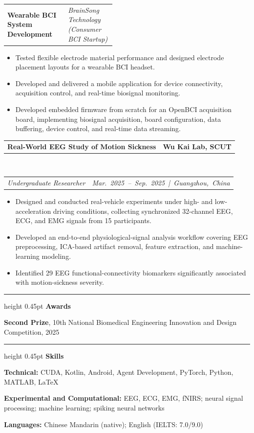 \documentclass[11pt,a4paper]{article}
\makeatletter
\newcommand{\researchentry}[5]{%
  \begin{tabularx}{\linewidth}{@{}
    >{\raggedright\arraybackslash\hyphenpenalty=10000\exhyphenpenalty=10000}X
    r@{}}
    \textbf{#1} & \textbf{#2}
  \end{tabularx}\\[1pt]
  \begin{tabularx}{\linewidth}{@{}Xr@{}}
    \textit{#3} & \textit{\mbox{#4 \;|\; #5}}
  \end{tabularx}
}
\newcommand{\projectorgtitle}[2]{%
  \vspace{3pt}
  \begin{tabularx}{\linewidth}{@{}
    >{\raggedright\arraybackslash}X
    >{\raggedleft\arraybackslash}p{0.44\linewidth}@{}}
    \textbf{#1} & {\small\itshape #2}
  \end{tabularx}\par
  \vspace{1pt}
}
\newcommand{\cvsection}[1]{%
  \vspace{12pt}
  \hrule height 0.45pt
  \vspace{12pt}
  {\large\bfseries #1}\par
  \vspace{6pt}
}
\makeatother
\begin{document}
\projectorgtitle
{Wearable BCI System Development}
{BrainSong Technology (Consumer BCI Startup)}
\begin{itemize}
  \item Tested flexible electrode material performance and designed
  electrode placement layouts for a wearable BCI headset.
  \item Developed and delivered a mobile application for device
  connectivity, acquisition control, and real-time biosignal monitoring.
  \item Developed embedded firmware from scratch for an OpenBCI
  acquisition board, implementing biosignal acquisition, board
  configuration, data buffering, device control, and real-time
  data streaming.
\end{itemize}

\vspace{1\baselineskip}

\researchentry
{Real-World EEG Study of Motion Sickness}
{Wu Kai Lab, SCUT}
{Undergraduate Researcher}
{Mar. 2025 -- Sep. 2025}
{Guangzhou, China}

\begin{itemize}
  \item Designed and conducted real-vehicle experiments under high-
  and low-acceleration driving conditions, collecting synchronized
  32-channel EEG, ECG, and EMG signals from 15 participants.
  \item Developed an end-to-end physiological-signal analysis workflow
  covering EEG preprocessing, ICA-based artifact removal, feature
  extraction, and machine-learning modeling.
  \item Identified 29 EEG functional-connectivity biomarkers
  significantly associated with motion-sickness severity.
\end{itemize}

\cvsection{Awards}

\textbf{Second Prize},
10th National Biomedical Engineering Innovation and Design Competition,
2025

\cvsection{Skills}

\textbf{Technical:}
CUDA, Kotlin, Android, Agent Development, PyTorch, Python, MATLAB, LaTeX

\textbf{Experimental and Computational:}
EEG, ECG, EMG, fNIRS;
neural signal processing;
machine learning;
spiking neural networks

\textbf{Languages:}
Chinese Mandarin (native);
English (IELTS: 7.0/9.0)
\end{document}
